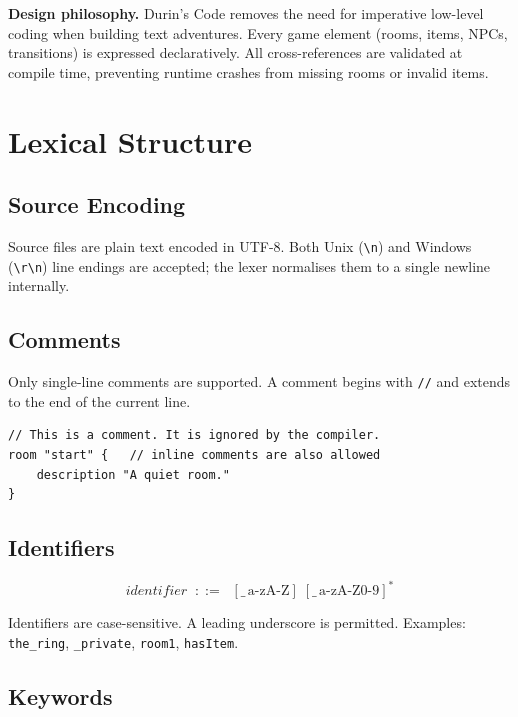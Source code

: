 \documentclass[12pt, a4paper]{article}
\begin{document}
\begin{infobox}
\textbf{Design philosophy.}
Durin's Code removes the need for imperative low-level coding when building text
adventures. Every game element (rooms, items, NPCs, transitions) is expressed
declaratively. All cross-references are validated at compile time, preventing
runtime crashes from missing rooms or invalid items.
\end{infobox}

\section{Lexical Structure}

\subsection{Source Encoding}
Source files are plain text encoded in UTF-8.
Both Unix (\texttt{\textbackslash n}) and Windows (\texttt{\textbackslash r\textbackslash n})
line endings are accepted; the lexer normalises them to a single newline internally.

\subsection{Comments}
Only single-line comments are supported. A comment begins with \texttt{//} and
extends to the end of the current line.

\begin{lstlisting}[style=dc, caption={Comment syntax}]
// This is a comment. It is ignored by the compiler.
room "start" {   // inline comments are also allowed
    description "A quiet room."
}
\end{lstlisting}

\subsection{Identifiers}

\[
  \textit{identifier} \;\;::=\;\; [\_\,\text{a-zA-Z}]\;[\_\,\text{a-zA-Z0-9}]^*
\]

Identifiers are case-sensitive. A leading underscore is permitted. Examples:
\texttt{the\_ring}, \texttt{\_private}, \texttt{room1}, \texttt{hasItem}.

\subsection{Keywords}
\end{document}
